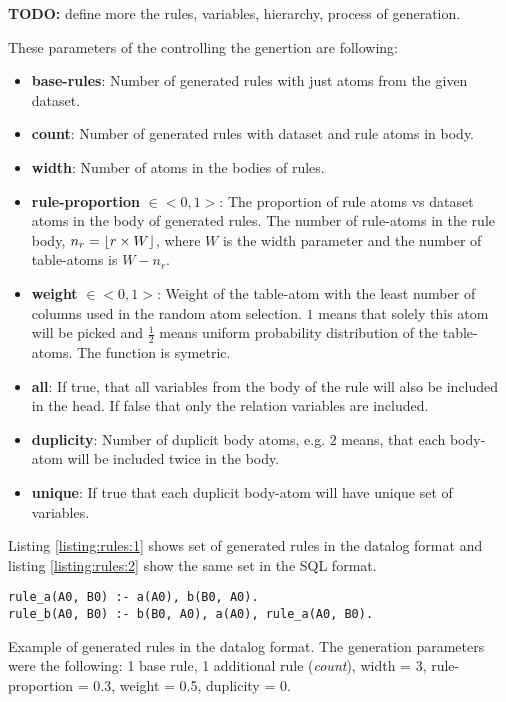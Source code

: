 \documentclass[12pt,oneside]{article}
\DeclarePairedDelimiter{\floor}{\lfloor}{\rfloor}
\begin{document}
\textbf{TODO:} define more the rules, variables, hierarchy, process of generation.

These parameters of the controlling the genertion are following:

\begin{itemize}
 \item \textbf{base-rules}: Number of generated rules with just atoms from the given dataset.

 \item \textbf{count}: Number of generated rules with dataset and rule atoms in body.

 \item \textbf{width}: Number of atoms in the bodies of rules.

 \item \textbf{rule-proportion} $\in <0, 1>$: The proportion of rule atoms vs dataset atoms in the
body of generated rules. The number of rule-atoms in the rule body, $n_r = \floor{r \times W}$,
where $W$ is the width parameter and the number of table-atoms is $W - n_r$.

 \item \textbf{weight} $\in <0, 1>$: Weight of the table-atom with the least number of columns used
in the random atom selection. $1$ means that solely this atom will be picked and $\frac{1}{2}$
means uniform probability distribution of the table-atoms. The function is symetric.

 \item \textbf{all}: If true, that all variables from the body of the rule will also be included in
the head. If false that only the relation variables are included.

 \item \textbf{duplicity}: Number of duplicit body atoms, e.g. $2$ means, that each body-atom will
be included twice in the body.

 \item \textbf{unique}: If true that each duplicit body-atom will have unique set of variables.
\end{itemize}



Listing \ref{listing:rules:1} shows set of generated rules in the datalog format and listing
\ref{listing:rules:2} show the same set in the SQL format.

\begin{listing}
 \begin{verbatim}
rule_a(A0, B0) :- a(A0), b(B0, A0).
rule_b(A0, B0) :- b(B0, A0), a(A0), rule_a(A0, B0).
 \end{verbatim}
\caption{Example of generated rules in the datalog format. The generation parameters were the
following: 1 base rule, 1 additional rule (\textit{count}), width = 3, rule-proportion = 0.3,
weight = 0.5, duplicity = 0.}
\label{listing:rules:1}
\end{listing}
\end{document}
